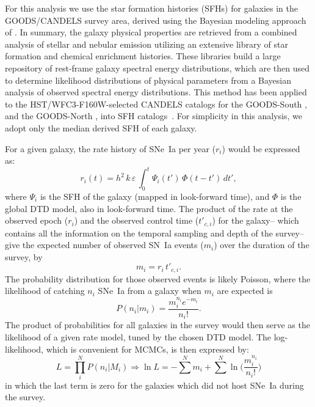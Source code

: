 \documentclass[apj]{aastex62}
\begin{document}
For this analysis we use the star formation histories (SFHs) for galaxies in the GOODS/CANDELS survey area, derived using the Bayesian modeling approach of \cite{Pacifici:2012ve}. In summary, the galaxy physical properties are retrieved from a combined analysis of stellar and nebular emission utilizing an extensive library of star formation and chemical enrichment histories. These libraries build a large repository of rest-frame galaxy spectral energy distributions, which are then used to determine likelihood distributions of physical parameters from a Bayesian analysis of observed spectral energy distributions. This method has been applied to the HST/WFC3-F160W-selected CANDELS catalogs for the GOODS-South \citep{Guo:2013rp}, and the GOODS-North \citep{Barro:2019vn}, into SFH catalogs~\cite[see][]{Pacifici:2016ul}. For simplicity in this analysis, we adopt only the median derived SFH of each galaxy.

For a given galaxy, the rate history of SNe~Ia per year ($r_i$) would be expressed as:
\begin{equation}
r_i (t) = h^2\,k\,\varepsilon\, \int_0^t \Psi_i(t')\,\Phi(t-t')\,dt',
\label{eqn:rate_history}
\end{equation}
\noindent where $\Psi_i$ is the SFH of the galaxy (mapped in look-forward time), and $\Phi$ is the global DTD model, also in look-forward time. The product of the rate at the observed epoch ($r_i$) and the observed control time ($t'_{c, i}$) for the galaxy-- which contains all the information on the temporal sampling and depth of the survey--  give the expected number of observed SN~Ia events ($m_i$) over the duration of the survey, by
\begin{equation}
m_i = r_i \, t'_{c, i}.
\end{equation}
\noindent The probability distribution for those observed events is likely Poisson, where the likelihood of catching $n_i$ SNe~Ia from a galaxy when $m_i$ are expected is
\begin{equation}
P(n_i | m_i) = \frac{m_i^{n_i}e^{-m_i}}{n_i!}.
\end{equation}
\noindent The product of probabilities for all galaxies in the survey would then serve as the likelihood of a given rate model, tuned by the chosen DTD model. The log-likelihood, which is convenient for MCMCs, is then expressed by:
\begin{equation}
L = \prod _i^N P(n_i|M_i) \Rightarrow \ln L = -\sum^N m_i+\sum^N\ln\biggl(\frac{m_i^{n_i}}{n_i!}\biggr)
\end{equation}
\noindent in which the last term is zero for the galaxies which did not host SNe~Ia during the survey.
\end{document}

